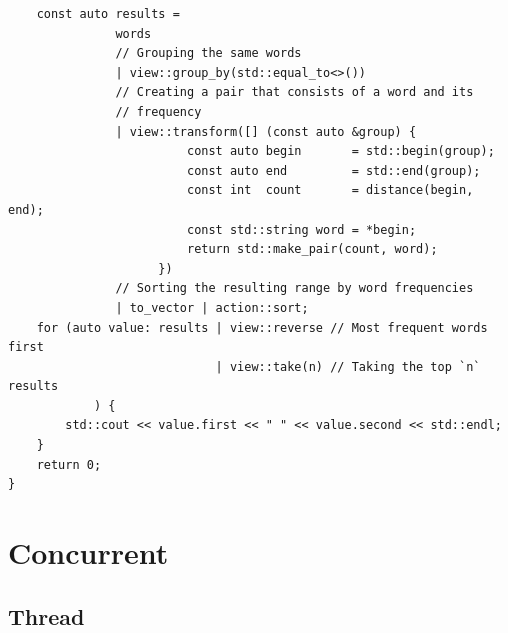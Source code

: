 \documentclass[a4paper,11pt,twoside]{book}
\begin{document}
\begin{itemize}
\begin{lstlisting}
    const auto results =
               words
               // Grouping the same words
               | view::group_by(std::equal_to<>())
               // Creating a pair that consists of a word and its
               // frequency
               | view::transform([] (const auto &group) {
                         const auto begin       = std::begin(group);
                         const auto end         = std::end(group);
                         const int  count       = distance(begin, end);
                         const std::string word = *begin;
                         return std::make_pair(count, word);
                     })
               // Sorting the resulting range by word frequencies
               | to_vector | action::sort;
    for (auto value: results | view::reverse // Most frequent words first
                             | view::take(n) // Taking the top `n` results
            ) {
        std::cout << value.first << " " << value.second << std::endl;
    }
    return 0;
}
\end{lstlisting}
\end{itemize}

\chapter{Concurrent}
\section{Thread}
\end{document}
